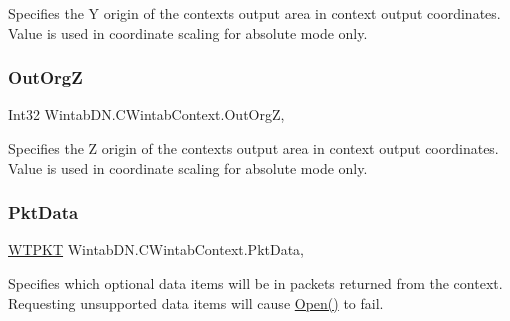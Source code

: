 Specifies the Y origin of the context\textquotesingle{}s output area in context output coordinates. Value is used in coordinate scaling for absolute mode only. 

\mbox{\label{class_wintab_d_n_1_1_c_wintab_context_aee6840f04cc34b466e683d9892e82648}} 
\subsubsection{\texorpdfstring{Out\+OrgZ}{OutOrgZ}}
{\footnotesize\ttfamily Int32 Wintab\+D\+N.\+C\+Wintab\+Context.\+Out\+OrgZ\hspace{0.3cm}{\ttfamily [get]}, {\ttfamily [set]}}



Specifies the Z origin of the context\textquotesingle{}s output area in context output coordinates. Value is used in coordinate scaling for absolute mode only. 

\mbox{\label{class_wintab_d_n_1_1_c_wintab_context_a3da21ad3b21239b8463f54a83f7f1bb8}} 
\subsubsection{\texorpdfstring{Pkt\+Data}{PktData}}
{\footnotesize\ttfamily \mbox{\hyperlink{class_wintab_d_n_1_1_w_t_p_k_t}{W\+T\+P\+KT}} Wintab\+D\+N.\+C\+Wintab\+Context.\+Pkt\+Data\hspace{0.3cm}{\ttfamily [get]}, {\ttfamily [set]}}



Specifies which optional data items will be in packets returned from the context. Requesting unsupported data items will cause \mbox{\hyperlink{class_wintab_d_n_1_1_c_wintab_context_a1522d857d00373971e9c0e010ae9e756}{Open()}} to fail. 

\mbox{\label{class_wintab_d_n_1_1_c_wintab_context_a05489816378ed5052a3e0e6a8a517d7b}} 
